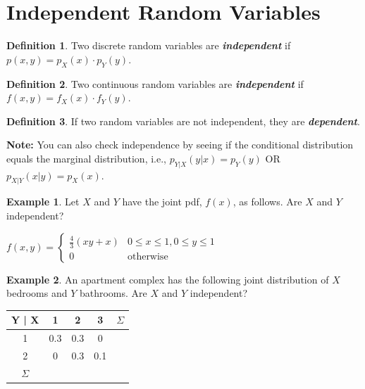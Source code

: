 \documentclass[
  11pt,
  oneside]{book}
\theoremstyle{definition}
\newtheorem{definition}{Definition}[chapter]
\theoremstyle{definition}
\newtheorem{example}{Example}[chapter]
\theoremstyle{definition}
\theoremstyle{definition}
\theoremstyle{remark}
\begin{document}
\vfill

\newpage

\section{Independent Random Variables}\label{independent-random-variables}

\begin{definition}
Two discrete random variables are \textbf{\emph{independent}} if \(p(x,y) = p_X(x) \cdot p_Y(y)\).
\end{definition}

\begin{definition}
Two continuous random variables are \textbf{\emph{independent}} if \(f(x,y) = f_X(x) \cdot f_Y(y)\).
\end{definition}

\begin{definition}
If two random variables are not independent, they are \textbf{\emph{dependent}}.
\end{definition}

\textbf{Note:} You can also check independence by seeing if the conditional distribution equals the marginal distribution, i.e., \(p_{Y|X}(y|x) = p_{Y}(y)\) OR \(p_{X|Y}(x|y) = p_X(x)\).

\begin{example}
Let \(X\) and \(Y\) have the joint pdf, \(f(x)\), as follows. Are \(X\) and \(Y\) independent?
\end{example}

\(f(x,y) = \begin{cases} \frac{4}{3}(xy + x) & 0 \leq x \leq 1, 0 \leq y \leq 1\\
0 & \text{otherwise}
\end{cases}\)

\vfill

\begin{example}
An apartment complex has the following joint distribution of \(X\) bedrooms and \(Y\) bathrooms. Are \(X\) and \(Y\) independent?
\end{example}

\begin{table}[!h]
\centering
\begin{tabular}{c|c|c|c|c}
\hline
Y | X & 1 & 2 & 3 & $\Sigma$\\
\hline
1 & 0.3 & 0.3 & 0 & \\
\hline
2 & 0 & 0.3 & 0.1 & \\
\hline
$\Sigma$ &  &  &  & \\
\hline
\end{tabular}
\end{table}
\end{document}
